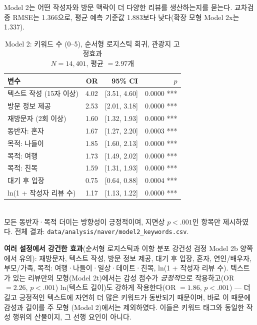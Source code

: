 \documentclass[10pt,a4paper]{article}
\newcommand{\subsect}[1]{\vspace{6pt}\noindent{\large\bfseries #1}\par\vspace{2pt}}
\begin{document}
\subsect{4.2 키워드 다양성 (Model 2)}
Model 2는 어떤 작성자와 방문 맥락이 더 다양한 리뷰를 생산하는지를 묻는다.
교차검증 RMSE는 1.366으로, 평균 예측 기준값 1.883보다 낮다(확장 모형
Model 2x는 1.337).

\begin{table}[H]\centering
\caption{Model 2: 키워드 수 (0--5), 순서형 로지스틱 회귀, 관광지 고정효과\\
\footnotesize $N = 14{,}401$, 평균 $= 2.97$개}
\footnotesize
\begin{tabular}{@{}lrrr@{}}
\toprule
변수 & OR & 95\% CI & $p$ \\
\midrule
텍스트 작성 (15자 이상)        & 4.02 & [3.51, 4.60] & 0.0000 *** \\
방문 정보 제공                  & 2.53 & [2.01, 3.18] & 0.0000 *** \\
재방문자 (2회 이상)              & 1.60 & [1.32, 1.93] & 0.0000 *** \\
동반자: 혼자                     & 1.67 & [1.27, 2.20] & 0.0003 *** \\
목적: 나들이                      & 1.85 & [1.60, 2.13] & 0.0000 *** \\
목적: 여행                         & 1.73 & [1.49, 2.02] & 0.0000 *** \\
목적: 친목                          & 1.59 & [1.31, 1.93] & 0.0000 *** \\
대기 후 입장                        & 0.75 & [0.64, 0.88] & 0.0004 *** \\
ln(1 + 작성자 리뷰 수)               & 1.17 & [1.13, 1.22] & 0.0000 *** \\
\bottomrule
\end{tabular}
\\[3pt]
{\scriptsize 모든 동반자·목적 더미는 방향성이 긍정적이며, 지면상 $p<.001$인 항목만 제시하였다. 전체 결과: \texttt{data/analysis/naver/model2\_keywords.csv}.}
\end{table}

\textbf{여러 설정에서 강건한 효과}(순서형 로지스틱과 이항 분포 강건성
검정 Model 2b 양쪽에서 유의): 재방문자, 텍스트 작성, 방문 정보 제공, 대기
후 입장, 혼자, 연인/배우자, 부모/가족, 목적: 여행·나들이·일상·데이트·친목,
ln(1 + 작성자 리뷰 수). 텍스트가 있는 리뷰만의 모형(Model 2t)에서는 감성
점수가 \emph{긍정적}으로 작용하고(OR $=2.26$, $p<.001$) ln(텍스트 길이)도
강하게 작용한다(OR $=1.86$, $p<.001$) — 더 길고 긍정적인 텍스트에 자연히
더 많은 키워드가 동반되기 때문이며, 바로 이 때문에 감성과 길이를 주 모형
(Model 2)에서는 제외하였다. 이들은 키워드 태그와 동일한 작성 행위의
산물이지, 그 선행 요인이 아니다.
\end{document}
